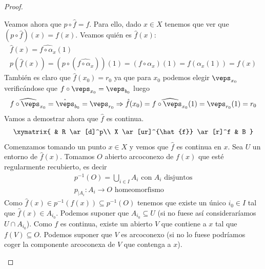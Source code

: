 \begin{teo}
\begin{proof}
\begin{itemize}
            Veamos ahora que $p\circ \hat{f}=f$. Para ello, dado $x\in X$ tenemos que ver que $(p\circ \hat{f})(x) = f(x)$. Veamos quién es $\hat{f}(x)$:
            \begin{gather*}
                \hat{f}(x) = \widehat{f\circ \alpha_x}(1)\\
                p(\hat{f}(x)) = (p\circ (\widehat{f\circ \alpha_x}))(1) = (f\circ \alpha_x)(1) = f(\alpha_x(1)) = f(x)
            \end{gather*}
            También es claro que $\hat{f}(x_0)=r_0$ ya que para $x_0$ podemos elegir $\veps_{x_0}$ verificándose que $f\circ \veps_{x_0} = \veps_{b_0}$ luego 
            \begin{gather*}
                \widehat{f\circ \veps_{x_0}} = \hat{\veps}_{b_0} = \veps_{r_0} \Rightarrow \hat{f}(x_0) = \widehat{f\circ \veps_{x_0}}(1) = \veps_{r_0}(1) = r_0
            \end{gather*}
            Vamos a demostrar ahora que $\hat{f}$ es continua. 
            \begin{gather*}
                \xymatrix{
                    & R \ar[d]^p\\
                    X \ar[ur]^{\hat{f}} \ar[r]^f & B
                }
            \end{gather*}
            Comenzamos tomando un punto $x\in X$ y vemos que $\hat{f}$ es continua en $x$. Sea $U$ un entorno de $\hat{f}(x)$. Tomamos $O$ abierto arcoconexo de $f(x)$ que esté regularmente recubierto, es decir
            \begin{gather*}
                p^{-1}(O) = \bigcup\limits_{i\in I} A_i \text{ con } A_i \text{ disjuntos}\\
                p_{|A_i} : A_i \to O \text{ homeomorfismo}
            \end{gather*}
            Como $\hat{f}(x)\in p^{-1}(f(x))\subseteq p^{-1}(O)$ tenemos que existe un único $i_0\in I$ tal que $\hat{f}(x)\in A_{i_0}$. Podemos suponer que $A_{i_0}\subseteq U$ (si no fuese así consideraríamos $U\cap A_{i_0}$). Como $f$ es continua, existe un abierto $V$ que contiene a $x$ tal que $f(V)\subseteq O$. Podemos suponer que $V$ es arcoconexo (si no lo fuese podríamos coger la componente arcoconexa de $V$ que contenga a $x$).\\
            

\end{itemize}
\end{proof}
\end{teo}
